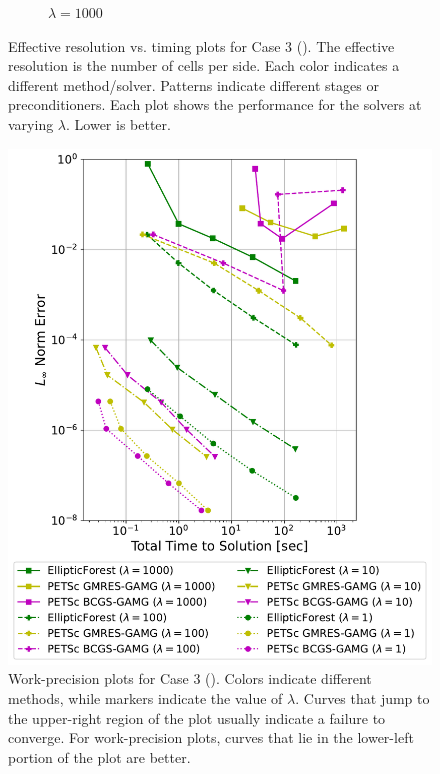 \begin{figure}
\begin{subfigure}[t]{0.48\textwidth}
        \caption{$\lambda = 1000$}
    \end{subfigure}
    \caption{Effective resolution vs. timing plots for Case 3 (). The effective resolution is the number of cells per side. Each color indicates a different method/solver. Patterns indicate different stages or preconditioners. Each plot shows the performance for the solvers at varying $\lambda$. Lower is better.}
    \label{fig:case03-stacked-bar-plot}
\end{figure}

\begin{figure}
    \centering
    \includegraphics[width=1.0\textwidth, clip=true, trim={0 0 0 0}]{figures/case03-work-precision-plots-no-title.pdf}
    \caption{Work-precision plots for Case 3 (). Colors indicate different methods, while markers indicate the value of $\lambda$. Curves that jump to the upper-right region of the plot usually indicate a failure to converge. For work-precision plots, curves that lie in the lower-left portion of the plot are better.}
    \label{fig:case03-work-precision-plot}
\end{figure}

